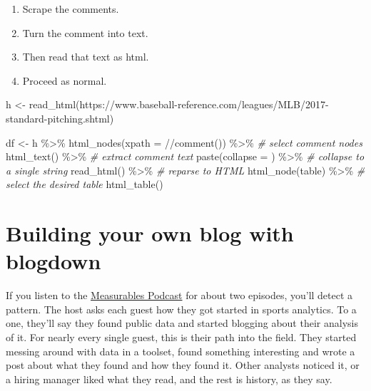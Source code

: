\documentclass[
]{book}
\newenvironment{Shaded}{\begin{snugshade}}{\end{snugshade}}
\newcommand{\AttributeTok}[1]{\textcolor[rgb]{0.77,0.63,0.00}{#1}}
\newcommand{\CommentTok}[1]{\textcolor[rgb]{0.56,0.35,0.01}{\textit{#1}}}
\newcommand{\FunctionTok}[1]{\textcolor[rgb]{0.00,0.00,0.00}{#1}}
\newcommand{\NormalTok}[1]{#1}
\newcommand{\OtherTok}[1]{\textcolor[rgb]{0.56,0.35,0.01}{#1}}
\newcommand{\SpecialCharTok}[1]{\textcolor[rgb]{0.00,0.00,0.00}{#1}}
\newcommand{\StringTok}[1]{\textcolor[rgb]{0.31,0.60,0.02}{#1}}
\providecommand{\tightlist}{%
  \setlength{\itemsep}{0pt}\setlength{\parskip}{0pt}}
\begin{document}
\begin{enumerate}
\def\labelenumi{\arabic{enumi}.}
\tightlist
\item
  Scrape the comments.
\item
  Turn the comment into text.
\item
  Then read that text as html.
\item
  Proceed as normal.
\end{enumerate}

\begin{Shaded}
\begin{Highlighting}[]
\NormalTok{h }\OtherTok{\textless{}{-}} \FunctionTok{read\_html}\NormalTok{(}\StringTok{\textquotesingle{}https://www.baseball{-}reference.com/leagues/MLB/2017{-}standard{-}pitching.shtml\textquotesingle{}}\NormalTok{)}

\NormalTok{df }\OtherTok{\textless{}{-}}\NormalTok{ h }\SpecialCharTok{\%\textgreater{}\%} \FunctionTok{html\_nodes}\NormalTok{(}\AttributeTok{xpath =} \StringTok{\textquotesingle{}//comment()\textquotesingle{}}\NormalTok{) }\SpecialCharTok{\%\textgreater{}\%}    \CommentTok{\# select comment nodes}
    \FunctionTok{html\_text}\NormalTok{() }\SpecialCharTok{\%\textgreater{}\%}    \CommentTok{\# extract comment text}
    \FunctionTok{paste}\NormalTok{(}\AttributeTok{collapse =} \StringTok{\textquotesingle{}\textquotesingle{}}\NormalTok{) }\SpecialCharTok{\%\textgreater{}\%}    \CommentTok{\# collapse to a single string}
    \FunctionTok{read\_html}\NormalTok{() }\SpecialCharTok{\%\textgreater{}\%}    \CommentTok{\# reparse to HTML}
    \FunctionTok{html\_node}\NormalTok{(}\StringTok{\textquotesingle{}table\textquotesingle{}}\NormalTok{) }\SpecialCharTok{\%\textgreater{}\%}    \CommentTok{\# select the desired table}
    \FunctionTok{html\_table}\NormalTok{() }
\end{Highlighting}
\end{Shaded}

\hypertarget{building-your-own-blog-with-blogdown}{%
\chapter{Building your own blog with blogdown}\label{building-your-own-blog-with-blogdown}}

If you listen to the \href{https://www.measurablespod.com/podcast}{Measurables Podcast} for about two episodes, you'll detect a pattern. The host asks each guest how they got started in sports analytics. To a one, they'll say they found public data and started blogging about their analysis of it. For nearly every single guest, this is their path into the field. They started messing around with data in a toolset, found something interesting and wrote a post about what they found and how they found it. Other analysts noticed it, or a hiring manager liked what they read, and the rest is history, as they say.
\end{document}
